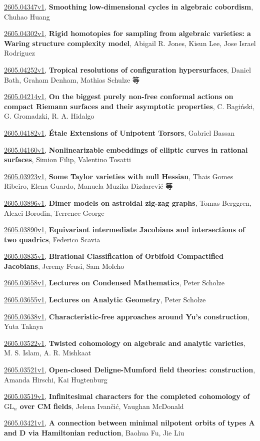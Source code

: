 \documentclass[9pt, a4paper]{article}
\theoremstyle{plain}
\theoremstyle{definition}
\theoremstyle{remark}
\newcommand{\arxiv}[3]{\href{https://arxiv.org/abs/#1}{#1}, \textbf{\textcolor{arxivblue}{#2}}, #3}
\begin{document}
\arxiv{2605.04347v1}{Smoothing low-dimensional cycles in algebraic cobordism}{Chuhao Huang}

\arxiv{2605.04302v1}{Rigid homotopies for sampling from algebraic varieties: a Waring structure complexity model}{Abigail R. Jones, Kisun Lee, Jose Israel Rodriguez}

\arxiv{2605.04252v1}{Tropical resolutions of configuration hypersurfaces}{Daniel Bath, Graham Denham, Mathias Schulze 等}

\arxiv{2605.04214v1}{On the biggest purely non-free conformal actions on compact Riemann surfaces and their asymptotic properties}{C. Bagiński, G. Gromadzki, R. A. Hidalgo}

\arxiv{2605.04182v1}{Étale Extensions of Unipotent Torsors}{Gabriel Bassan}

\arxiv{2605.04160v1}{Nonlinearizable embeddings of elliptic curves in rational surfaces}{Simion Filip, Valentino Tosatti}

\arxiv{2605.03923v1}{Some Taylor varieties with null Hessian}{Thais Gomes Ribeiro, Elena Guardo, Manuela Muzika Dizdarević 等}

\arxiv{2605.03896v1}{Dimer models on astroidal zig-zag graphs}{Tomas Berggren, Alexei Borodin, Terrence George}

\arxiv{2605.03890v1}{Equivariant intermediate Jacobians and intersections of two quadrics}{Federico Scavia}

\arxiv{2605.03835v1}{Birational Classification of Orbifold Compactified Jacobians}{Jeremy Feusi, Sam Molcho}

\arxiv{2605.03658v1}{Lectures on Condensed Mathematics}{Peter Scholze}

\arxiv{2605.03655v1}{Lectures on Analytic Geometry}{Peter Scholze}

\arxiv{2605.03638v1}{Characteristic-free approaches around Yu's construction}{Yuta Takaya}

\arxiv{2605.03522v1}{Twisted cohomology on algebraic and analytic varieties}{M. S. Islam, A. R. Mishkaat}

\arxiv{2605.03521v1}{Open-closed Deligne-Mumford field theories: construction}{Amanda Hirschi, Kai Hugtenburg}

\arxiv{2605.03519v1}{Infinitesimal characters for the completed cohomology of $\mathrm{GL}_n$ over CM fields}{Jelena Ivančić, Vaughan McDonald}

\arxiv{2605.03421v1}{A connection between minimal nilpotent orbits of types A and D via Hamiltonian reduction}{Baohua Fu, Jie Liu}
\end{document}

